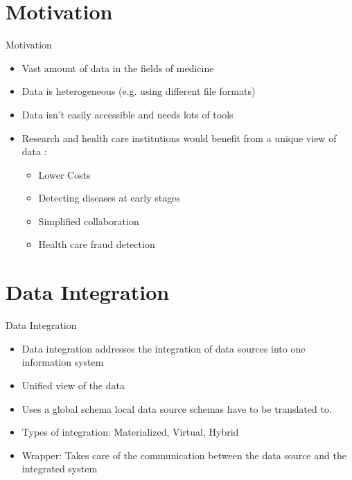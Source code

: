 
\section{Motivation}
\begin{frame}{Motivation}
    \begin{itemize}
    \item Vast amount of data in the fields of medicine
    \item Data is heterogeneous (e.g. using different file formats)
    \item Data isn't easily accessible and needs lots of tools
    
    \item Research and health care institutions would benefit from a unique view of data \cite{Raghupathi2014}:
    \begin{itemize}
    	\item Lower Costs
    	\item Detecting diseases at early stages
    	\item Simplified collaboration
    	\item Health care fraud detection
    \end{itemize}
    \end{itemize}
\end{frame}

\def \data_integration_title{Data Integration}

\section{Data Integration}
\begin{frame}{\data_integration_title}
    \begin{itemize}
    \item Data integration addresses the integration of data sources into one information system \cite{DBLP:books/dp/LeserN2006}
    \item Unified view of the data
    \item Uses a global schema local data source schemas have to be translated to.
    \item Types of integration: Materialized, Virtual, Hybrid
    \item Wrapper: Takes care of the communication between the data source and the integrated system

\end{itemize}    
\end{frame}

